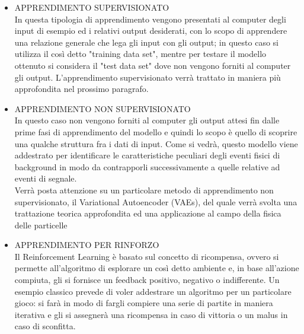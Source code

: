 \begin{itemize}
	\item APPRENDIMENTO SUPERVISIONATO \\
	In questa tipologia di apprendimento vengono presentati al computer degli input di esempio ed i relativi output desiderati, con lo scopo di apprendere una relazione generale che lega gli input con gli output; in questo caso si utilizza il così detto "training data set", mentre per testare il modello ottenuto si considera il "test data set" dove non vengono forniti al computer gli output. L'apprendimento supervisionato verrà trattato in maniera più approfondita nel prossimo paragrafo.
	\item APPRENDIMENTO NON SUPERVISIONATO \\
	In questo caso non vengono forniti al computer gli output attesi fin dalle prime fasi di apprendimento del modello e quindi lo scopo è quello di scoprire una qualche struttura fra i dati di input.%
	Come si vedrà, questo modello viene addestrato per identificare le caratteristiche peculiari degli eventi fisici di background in modo da contrapporli successivamente a quelle relative ad eventi di segnale.\\
	Verrà posta attenzione su un particolare metodo di apprendimento non supervisionato, il Variational Autoencoder (VAEs), del quale verrà svolta una trattazione teorica approfondita ed una applicazione al campo della fisica delle particelle
	\item APPRENDIMENTO PER RINFORZO \\
	Il Reinforcement Learning è basato sul concetto di ricompensa, ovvero si permette all'algoritmo di esplorare un così detto ambiente e, in base all'azione compiuta, gli si fornisce un feedback positivo, negativo o indifferente. Un esempio classico prevede di voler addestrare un algoritmo per un particolare gioco: si farà in modo di fargli compiere una serie di partite in maniera iterativa e gli si assegnerà una ricompensa in caso di vittoria o un malus in caso di sconfitta. \\ 
\end{itemize}

\newpage

